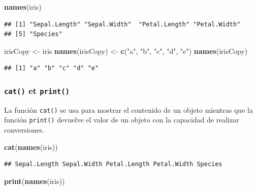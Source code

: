 \documentclass[]{book}
\newenvironment{Shaded}{\begin{snugshade}}{\end{snugshade}}
\newcommand{\KeywordTok}[1]{\textcolor[rgb]{0.13,0.29,0.53}{\textbf{#1}}}
\newcommand{\StringTok}[1]{\textcolor[rgb]{0.31,0.60,0.02}{#1}}
\newcommand{\NormalTok}[1]{#1}
\begin{document}
\begin{Shaded}
\begin{Highlighting}[]
\KeywordTok{names}\NormalTok{(iris)}
\end{Highlighting}
\end{Shaded}

\begin{verbatim}
## [1] "Sepal.Length" "Sepal.Width"  "Petal.Length" "Petal.Width" 
## [5] "Species"
\end{verbatim}

\begin{Shaded}
\begin{Highlighting}[]
\NormalTok{irisCopy <-}\StringTok{ }\NormalTok{iris}
\KeywordTok{names}\NormalTok{(irisCopy) <-}\StringTok{ }\KeywordTok{c}\NormalTok{(}\StringTok{"a"}\NormalTok{, }\StringTok{"b"}\NormalTok{, }\StringTok{"c"}\NormalTok{, }\StringTok{"d"}\NormalTok{, }\StringTok{"e"}\NormalTok{)}
\KeywordTok{names}\NormalTok{(irisCopy)}
\end{Highlighting}
\end{Shaded}

\begin{verbatim}
## [1] "a" "b" "c" "d" "e"
\end{verbatim}

\subsubsection{\texorpdfstring{\texttt{cat()} et
\texttt{print()}}{cat() et print()}}\label{l015print}

La función \texttt{cat()} se usa para mostrar el contenido de un objeto
mientras que la función \texttt{print()} devuelve el valor de un objeto
con la capacidad de realizar conversiones.

\begin{Shaded}
\begin{Highlighting}[]
\KeywordTok{cat}\NormalTok{(}\KeywordTok{names}\NormalTok{(iris))}
\end{Highlighting}
\end{Shaded}

\begin{verbatim}
## Sepal.Length Sepal.Width Petal.Length Petal.Width Species
\end{verbatim}

\begin{Shaded}
\begin{Highlighting}[]
\KeywordTok{print}\NormalTok{(}\KeywordTok{names}\NormalTok{(iris))}
\end{Highlighting}
\end{Shaded}
\end{document}
